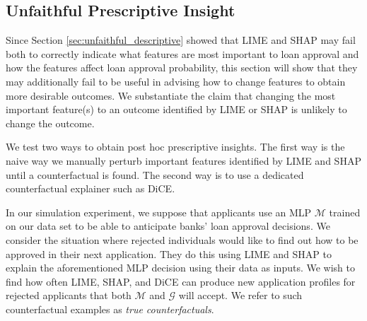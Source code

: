 \documentclass[11pt]{article}    %
\begin{document}
    \subsection{Unfaithful Prescriptive Insight}
        \label{sec:actionable_recourse}
        Since Section \ref{sec:unfaithful_descriptive} showed that LIME and SHAP may fail both to correctly indicate what features are most important to loan approval and how the features affect loan approval probability, this section will show that they may additionally fail to be useful in advising how to change features to obtain more desirable outcomes. We substantiate the claim that changing the most important feature(s) to an outcome identified by LIME or SHAP is unlikely to change the outcome. 
        
        We test two ways to obtain post hoc prescriptive insights. %
        The first way is the naive way \textemdash we manually perturb important features identified by LIME and SHAP until a counterfactual is found. The second way is to use a dedicated counterfactual explainer such as DiCE.

            
        In our simulation experiment, we suppose that applicants use an MLP $\mathcal{M}$ trained on our data set to be able to anticipate banks' loan approval decisions. We consider the situation where rejected individuals would like to find out how to be approved in their next application. They do this using LIME and SHAP to explain the aforementioned MLP decision using their data as inputs. We wish to find how often LIME, SHAP, and DiCE can produce new application profiles for rejected applicants that both $\mathcal{M}$ and $\mathcal{G}$ will accept. We refer to such counterfactual examples as \emph{true counterfactuals}. 
\end{document}
